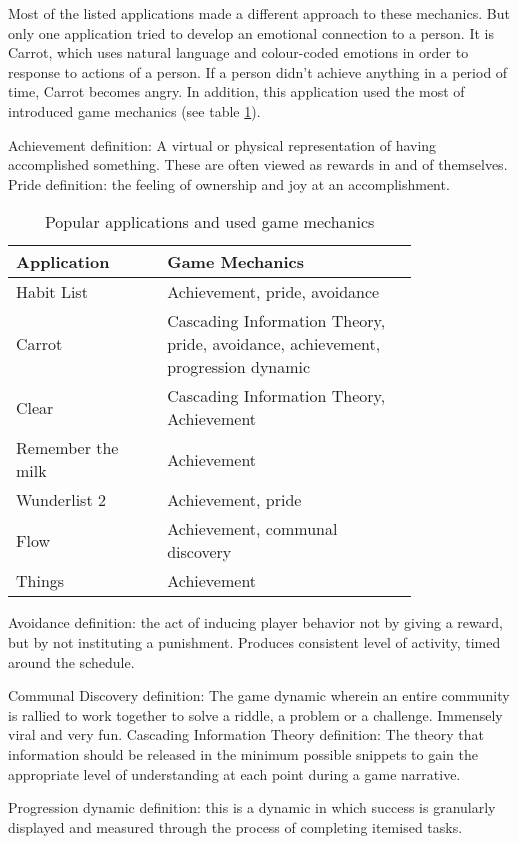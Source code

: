 Most of the listed applications made a different approach to these mechanics. But only one application tried to develop an emotional connection to a person. It is Carrot, which uses natural language and colour-coded emotions in order to response to actions of a person. If a person didn’t achieve anything in a period of time, Carrot becomes angry. In addition, this application used the most of introduced game mechanics (see table \ref{tab:appsandmech}).

Achievement definition: A virtual or physical representation of having accomplished something. These are often viewed as rewards in and of themselves.
Pride definition: the feeling of ownership and joy at an accomplishment.

\begin{longtable}{|p{0.3\linewidth}|p{0.5\linewidth}|}
\caption{Popular applications and used game mechanics}
\label{tab:appsandmech}\\
\hline
\bf Application &  \bf Game Mechanics \\
\hline
\endhead
Habit List & Achievement, pride, avoidance \\
\hline
Carrot & Cascading Information Theory, pride, avoidance, achievement, progression dynamic \\
\hline
Clear & Cascading Information Theory, Achievement \\
\hline
Remember the milk & Achievement \\
\hline
Wunderlist 2 & Achievement, pride \\
\hline
Flow & Achievement, communal discovery \\
\hline
Things & Achievement\\
\hline
\end{longtable}

Avoidance definition:  the act of inducing player behavior not by giving a reward, but by not instituting a punishment. Produces consistent level of activity, timed around the schedule.

Communal Discovery definition: The game dynamic wherein an entire community is rallied to work together to solve a riddle, a problem or a challenge. Immensely viral and very fun.
Cascading Information Theory definition: The theory that information should be released in the minimum possible snippets to gain the appropriate level of understanding at each point during a game narrative.

Progression dynamic definition: this is a dynamic in which success is granularly displayed and measured through the process of completing itemised tasks.

